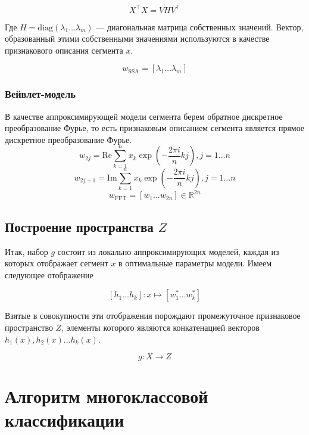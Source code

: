 \documentclass[12pt,fleqn,unicode]{article}
\newcommand{\by}{\mathbf{y}}
\newcommand{\bY}{\mathbf{Y}}
\newcommand{\bX}{\mathbf{X}}
\newcommand{\bu}{\mathbf{u}}
\newcommand{\bh}{\mathbf{h}}
\newcommand{\bP}{\mathbf{P}}
\newcommand{\bI}{\mathbf{I}}
\newcommand{\R}{\mathbb{R}}
\newcommand{\brs}[1]{\left(#1\right)}
\newcommand{\sbrs}[1]{\left[#1\right]}
\begin{document}
$$
X^\intercal X = VHV^\intercal
$$

Где $H = \mathrm{diag}(\lambda_1\ldots \lambda_m)$ --- диагональная матрица собственных значений.
Вектор, образованный этими собственными значениями используются в качестве
признакового описания сегмента $x$.

$$
w_{\text{SSA}} = [\lambda_1 \ldots \lambda_m]
$$

\subsubsection{Вейвлет-модель}

В качестве аппроксимирующей модели сегмента берем обратное дискретное
преобразование Фурье,
то есть признаковым описанием сегмента является прямое дискретное преобразование
Фурье.
$$
    w_{2j} = \mathrm{Re} \sum_{k=1}^{n} x_k \exp\brs{-\frac{2\pi i}{n}kj}, j=1\ldots n
$$
$$
    w_{2j + 1} = \mathrm{Im} \sum_{k=1}^{n} x_k \exp\brs{-\frac{2\pi i}{n}kj}, j=1\ldots n
$$
$$
w_{\text{FFT}} = \sbrs{w_1\ldots w_{2n}}\in \R^{2n}
$$

\subsection{Построение пространства $Z$}


Итак, набор $g$ состоит из локально аппроксимирующих моделей, каждая из которых
отображает сегмент $x$ в оптимальные параметры модели. Имеем следующее отображение

$$
[h_1\ldots h_k]: x \mapsto [w_1^* \ldots w_k^*]
$$

Взятые в совокупности эти отображения порождают промежуточное признаковое пространство
$Z$, элементы которого являются конкатенацией векторов $h_1(x), h_2(x)\ldots h_k(x)$.

$$
g: X \to Z
$$

\section{Алгоритм многоклассовой классификации}


\end{document}
